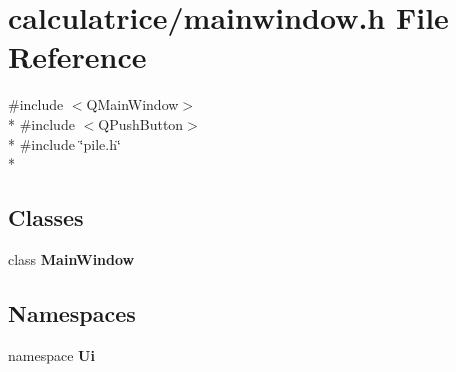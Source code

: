 \section{calculatrice/mainwindow.h File Reference}
\label{mainwindow_8h}
{\ttfamily \#include $<$Q\-Main\-Window$>$}\\*
{\ttfamily \#include $<$Q\-Push\-Button$>$}\\*
{\ttfamily \#include \char`\"{}pile.\-h\char`\"{}}\\*
\subsection*{Classes}
\begin{DoxyCompactItemize}
\item 
class {\bf Main\-Window}
\end{DoxyCompactItemize}
\subsection*{Namespaces}
\begin{DoxyCompactItemize}
\item 
namespace {\bf Ui}
\end{DoxyCompactItemize}
